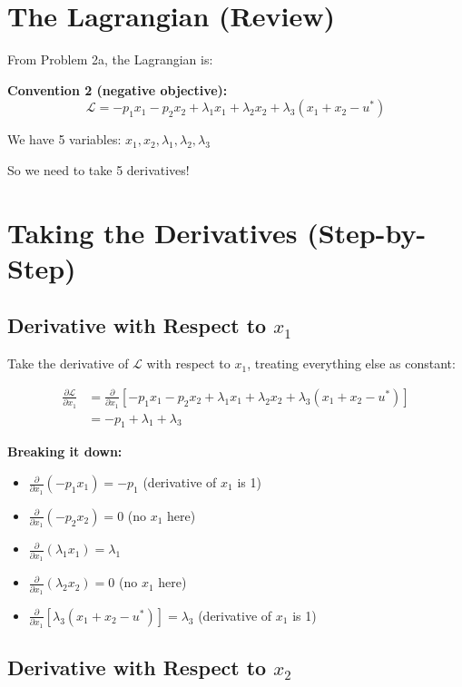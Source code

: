\documentclass[11pt]{article}
\begin{document}
\section{The Lagrangian (Review)}

From Problem 2a, the Lagrangian is:

\textbf{Convention 2 (negative objective):}
$$\mathcal{L} = -p_1 x_1 - p_2 x_2 + \lambda_1 x_1 + \lambda_2 x_2 + \lambda_3(x_1 + x_2 - u^*)$$

We have 5 variables: $x_1, x_2, \lambda_1, \lambda_2, \lambda_3$

So we need to take 5 derivatives!

\section{Taking the Derivatives (Step-by-Step)}

\subsection{Derivative with Respect to $x_1$}

Take the derivative of $\mathcal{L}$ with respect to $x_1$, treating everything else as constant:

\begin{align*}
\frac{\partial \mathcal{L}}{\partial x_1} &= \frac{\partial}{\partial x_1}\left[-p_1 x_1 - p_2 x_2 + \lambda_1 x_1 + \lambda_2 x_2 + \lambda_3(x_1 + x_2 - u^*)\right] \\
&= -p_1 + \lambda_1 + \lambda_3
\end{align*}

\textbf{Breaking it down:}
\begin{itemize}
\item $\frac{\partial}{\partial x_1}(-p_1 x_1) = -p_1$ (derivative of $x_1$ is 1)
\item $\frac{\partial}{\partial x_1}(-p_2 x_2) = 0$ (no $x_1$ here)
\item $\frac{\partial}{\partial x_1}(\lambda_1 x_1) = \lambda_1$
\item $\frac{\partial}{\partial x_1}(\lambda_2 x_2) = 0$ (no $x_1$ here)
\item $\frac{\partial}{\partial x_1}[\lambda_3(x_1 + x_2 - u^*)] = \lambda_3$ (derivative of $x_1$ is 1)
\end{itemize}

\subsection{Derivative with Respect to $x_2$}
\end{document}

